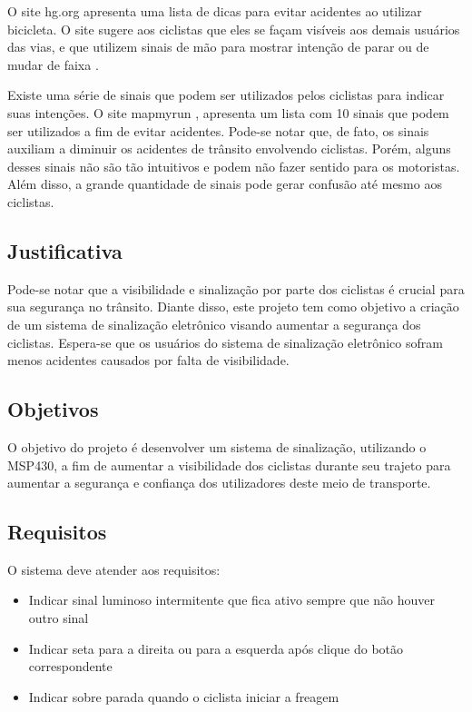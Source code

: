 \documentclass[conference]{IEEEtran}
\begin{document}
O site hg.org apresenta uma lista de dicas para evitar acidentes ao utilizar bicicleta. O site sugere aos ciclistas que eles se façam visíveis aos demais usuários das vias, e que utilizem sinais de mão para mostrar intenção de parar ou de mudar de faixa \cite{b4}.

Existe uma série de sinais que podem ser utilizados pelos ciclistas para indicar suas intenções. O site mapmyrun \cite{b5}, apresenta um lista com 10 sinais que podem ser utilizados a fim de evitar acidentes. Pode-se notar que, de fato, os sinais auxiliam a diminuir os acidentes de trânsito envolvendo ciclistas. Porém, alguns desses sinais não são tão intuitivos e podem não fazer sentido para os motoristas. Além disso, a grande quantidade de sinais pode gerar confusão até mesmo aos ciclistas.


\subsection{Justificativa}
Pode-se notar que a visibilidade e sinalização por parte dos ciclistas é crucial para sua segurança no trânsito. Diante disso, este projeto tem como objetivo a criação de um sistema de sinalização eletrônico visando aumentar a segurança dos ciclistas. Espera-se que os usuários do sistema de sinalização eletrônico sofram menos acidentes causados por falta de visibilidade.

\subsection{Objetivos}
O objetivo do projeto é desenvolver um sistema de sinalização, utilizando o
MSP430, a fim de aumentar a visibilidade dos ciclistas durante seu trajeto para
aumentar a segurança e confiança dos utilizadores deste meio de transporte.

\subsection{Requisitos}
O sistema deve atender aos requisitos:
\begin{itemize}
  \item Indicar sinal luminoso intermitente que fica ativo sempre que não houver outro sinal
  \item Indicar seta para a direita ou para a esquerda após clique do botão correspondente
  \item Indicar sobre parada quando o ciclista iniciar a freagem
\end{itemize}
\end{document}

